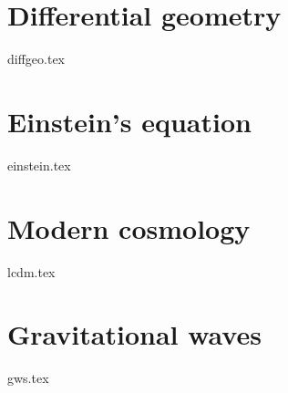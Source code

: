 





\section{Differential geometry}\label{sec:GR:diffgeo}
{{diffgeo.tex}}


\section{Einstein's equation}\label{sec:GR:einstein}
{{einstein.tex}}


\section{Modern cosmology}\label{sec:GR:lcdm}
{{lcdm.tex}}


\section{Gravitational waves}\label{sec:GR:gws}
{{gws.tex}}











\clearpage
\newpage
